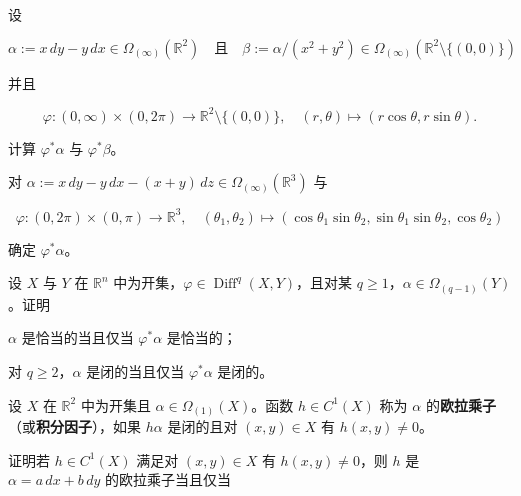 \begin{exercises}
\item

设

\[
\alpha := x\,dy - y\,dx \in \Omega_{(\infty)}(\mathbb{R}^{2}) \quad \text{且} \quad \beta := \alpha/(x^{2} + y^{2}) \in \Omega_{(\infty)}(\mathbb{R}^{2}\setminus\{(0,0)\})
\]

并且

\[
\varphi : (0,\infty)\times(0,2\pi) \to \mathbb{R}^{2}\setminus\{(0,0)\} , \quad (r, \theta) \mapsto (r\cos\theta, r\sin\theta) .
\]

计算 $ \varphi^{*}\alpha $ 与 $ \varphi^{*}\beta $。

\item

对 $ \alpha := x\,dy - y\,dx - (x + y)\,dz \in \Omega_{(\infty)}(\mathbb{R}^{3}) $ 与

\[
\varphi : (0,2\pi)\times(0,\pi) \to \mathbb{R}^{3} , \quad (\theta_{1}, \theta_{2}) \mapsto (\cos\theta_{1}\sin\theta_{2}, \sin\theta_{1}\sin\theta_{2}, \cos\theta_{2})
\]

确定 $ \varphi^{*}\alpha $。

\item

设 $ X $ 与 $ Y $ 在 $ \mathbb{R}^{n} $ 中为开集，$ \varphi \in \operatorname{Diff}^{q}(X, Y) $，且对某 $ q \ge 1 $，$ \alpha \in \Omega_{(q-1)}(Y) $。证明

\begin{items}
\item

$ \alpha $ 是恰当的当且仅当 $ \varphi^{*}\alpha $ 是恰当的；

\item

对 $ q \ge 2 $，$ \alpha $ 是闭的当且仅当 $ \varphi^{*}\alpha $ 是闭的。

\end{items}

\item

设 $ X $ 在 $ \mathbb{R}^{2} $ 中为开集且 $ \alpha \in \Omega_{(1)}(X) $。函数 $ h \in C^{1}(X) $ 称为 $ \alpha $ 的\textbf{欧拉乘子}（或\textbf{积分因子}），如果 $ h\alpha $ 是闭的且对 $ (x, y) \in X $ 有 $ h(x, y) \ne 0 $。

\begin{items}
\item

证明若 $ h \in C^{1}(X) $ 满足对 $ (x, y) \in X $ 有 $ h(x, y) \ne 0 $，则 $ h $ 是 $ \alpha = a\,dx + b\,dy $ 的欧拉乘子当且仅当


\end{items}
\end{exercises}
